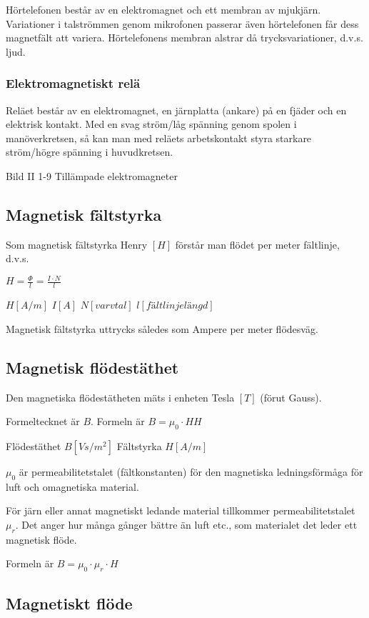 Hörtelefonen består av en elektromagnet och ett membran av mjukjärn. Variationer i
talströmmen genom mikrofonen passerar även hörtelefonen får dess magnetfält att variera.
Hörtelefonens membran alstrar då trycksvariationer, d.v.s. ljud.

\subsubsection{Elektromagnetiskt relä}
Reläet består av en elektromagnet, en järnplatta (ankare) på en fjäder och en elektrisk
kontakt. Med en svag ström/låg spänning genom spolen i manöverkretsen, så kan
man med reläets arbetskontakt styra starkare ström/högre spänning i huvudkretsen.

Bild II 1-9 Tillämpade elektromagneter

\subsection{Magnetisk fältstyrka}

Som magnetisk fältstyrka Henry $[H]$ förstår man flödet per meter fältlinje, d.v.s.

$H=\frac{\Phi}{l} = \frac{I \cdot N}{l}$

$H [A/m]$ $I [A]$ $N [varvtal]$ $l [fältlinjelängd]$

Magnetisk fältstyrka uttrycks således som Ampere per meter flödesväg.

\subsection{Magnetisk flödestäthet}

Den magnetiska flödestätheten mäts i enheten Tesla $[T]$ (förut Gauss).

Formeltecknet är $B$.
Formeln är $B = \mu_0 \cdot HH$

Flödestäthet $B [Vs/m^2]$ Fältstyrka $H [A/m]$

$\mu_0$ är permeabilitetstalet (fältkonstanten) för den magnetiska ledningsförmåga för
luft och omagnetiska material.

För järn eller annat magnetiskt ledande material tillkommer permeabilitetstalet $\mu_r$.
Det anger hur många gånger bättre än luft etc., som materialet det leder ett magnetisk
flöde.

Formeln är $B = \mu_0 \cdot \mu_r \cdot H$

\subsection{Magnetiskt flöde}

